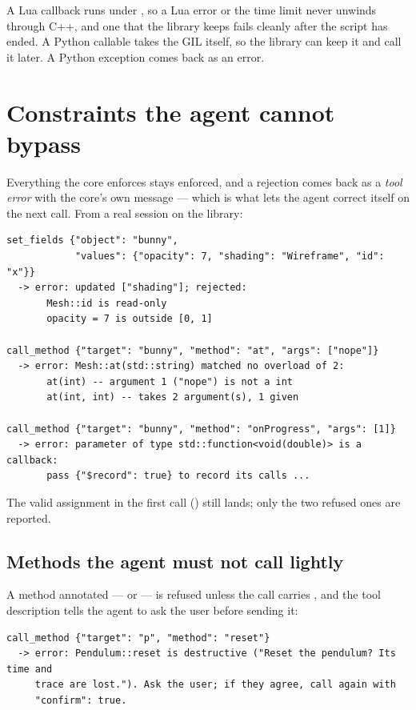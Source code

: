 A Lua callback runs under , so a Lua error or the time limit
never unwinds through C++, and one that the library keeps fails cleanly after
the script has ended. A Python callable takes the GIL itself, so the library
can keep it and call it later. A Python exception comes back as an error.

\section{Constraints the agent cannot bypass}

Everything the core enforces stays enforced, and a rejection comes back as a
\emph{tool error} with the core's own message --- which is what lets the agent
correct itself on the next call. From a real session on the 
library:

\begin{lstlisting}[style=plain]
set_fields {"object": "bunny",
            "values": {"opacity": 7, "shading": "Wireframe", "id": "x"}}
  -> error: updated ["shading"]; rejected:
       Mesh::id is read-only
       opacity = 7 is outside [0, 1]

call_method {"target": "bunny", "method": "at", "args": ["nope"]}
  -> error: Mesh::at(std::string) matched no overload of 2:
       at(int) -- argument 1 ("nope") is not a int
       at(int, int) -- takes 2 argument(s), 1 given

call_method {"target": "bunny", "method": "onProgress", "args": [1]}
  -> error: parameter of type std::function<void(double)> is a callback:
       pass {"$record": true} to record its calls ...
\end{lstlisting}

The valid assignment in the first call () still lands; only the
two refused ones are reported.

\subsection*{Methods the agent must not call lightly}

A method annotated  --- or  ---
is refused unless the call carries , and the tool
description tells the agent to ask the user before sending it:

\begin{lstlisting}[style=plain]
call_method {"target": "p", "method": "reset"}
  -> error: Pendulum::reset is destructive ("Reset the pendulum? Its time and
     trace are lost."). Ask the user; if they agree, call again with
     "confirm": true.
\end{lstlisting}

